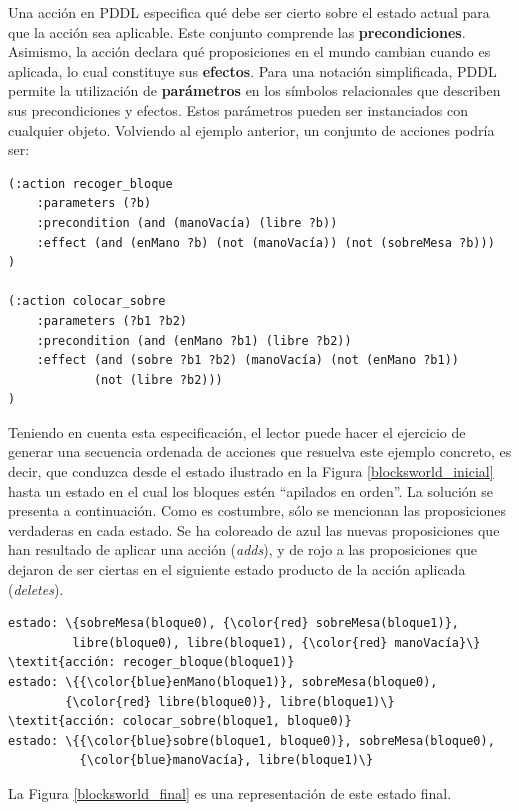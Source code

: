 Una acción en PDDL especifica qué debe ser cierto sobre el estado actual para
que la acción sea aplicable. 
Este conjunto comprende las \textbf{precondiciones}. Asimismo,
la acción declara qué proposiciones en el mundo cambian cuando es aplicada,
lo cual constituye sus \textbf{efectos}. Para una notación
simplificada, PDDL permite la utilización de \textbf{parámetros} en los
símbolos relacionales que describen sus precondiciones y efectos. Estos
parámetros pueden ser instanciados con cualquier objeto. Volviendo al
ejemplo anterior, un conjunto de acciones podría ser:
\begin{Verbatim}[commandchars=\\\{\},
codes={\catcode`$=3\catcode`^=7}]
(:action recoger_bloque
    :parameters (?b)
    :precondition (and (manoVacía) (libre ?b))
    :effect (and (enMano ?b) (not (manoVacía)) (not (sobreMesa ?b)))
)

(:action colocar_sobre
    :parameters (?b1 ?b2)
    :precondition (and (enMano ?b1) (libre ?b2))
    :effect (and (sobre ?b1 ?b2) (manoVacía) (not (enMano ?b1))
            (not (libre ?b2)))
)
\end{Verbatim}

Teniendo en cuenta esta especificación, el lector puede hacer el ejercicio de
generar una secuencia ordenada de acciones que resuelva este ejemplo
concreto, es decir, que conduzca desde el estado ilustrado en la Figura
\ref{blocksworld_inicial} hasta un estado en el cual los bloques estén ``apilados en
orden''. La solución se presenta a continuación. Como es costumbre, sólo se
mencionan las proposiciones verdaderas en cada estado. Se ha coloreado de azul
las nuevas proposiciones que han resultado de aplicar una acción
(\textit{adds}), y de rojo a las proposiciones que dejaron de ser ciertas en el
siguiente estado producto de la acción aplicada (\textit{deletes}).
\begin{Verbatim}[commandchars=\\\{\},
codes={\catcode`$=3\catcode`^=7}]
estado: \{sobreMesa(bloque0), {\color{red} sobreMesa(bloque1)},
         libre(bloque0), libre(bloque1), {\color{red} manoVacía}\}
\textit{acción: recoger_bloque(bloque1)}
estado: \{{\color{blue}enMano(bloque1)}, sobreMesa(bloque0),
        {\color{red} libre(bloque0)}, libre(bloque1)\}
\textit{acción: colocar_sobre(bloque1, bloque0)}
estado: \{{\color{blue}sobre(bloque1, bloque0)}, sobreMesa(bloque0),
          {\color{blue}manoVacía}, libre(bloque1)\}
\end{Verbatim}

La Figura \ref{blocksworld_final} es una representación de este estado final.

